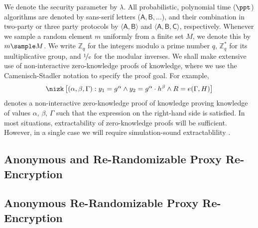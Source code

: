 \documentclass[runningheads]{llncs}
\newcommand{\Z}{\mathbb{Z}}
\DeclareMathOperator{\gen}{\mathsf{Gen}}
\DeclareMathOperator{\prove}{\mathsf{Prove}}
\begin{document}
We denote the security parameter by $\lambda$.
All probabilistic, polynomial time ($\ppt$) algorithms are denoted by sans-serif letters ($\mathsf A, \mathsf B, \ldots$), and  their combination in two-party or three party protocols by $ \langle \mathsf A, \mathsf B\rangle$ and $\langle \mathsf A, \mathsf B, \mathsf C\rangle$, respectively.
Whenever we sample a random element $m$ uniformly from a finite set $M$, we denote this by $m\sample M$.
We write $\Z_q$ for the integers modulo a prime number $q$, $\Z_q^*$ for its multiplicative group, and $\nicefrac{1}{e}$ for the modular inverses.
We shall make extensive use of non-interactive zero-knowledge proofs of knowledge, where we use the Camenisch-Stadler notation to specify the proof goal.
For example, 
\[
\nizk\left[(\alpha, \beta, \Gamma) : y_1 = g^{\alpha}  \wedge y_2 = g^{\alpha}\cdot h^{\beta} \wedge R= e(\Gamma, H) \right] 
\]
denotes a non-interactive zero-knowledge proof of knowledge proving knowledge of values $\alpha$, $\beta$, $\Gamma$ such that the expression on the right-hand side is satisfied. 
In most situations, extractability of zero-knowledge proofs will be sufficient. 
However, in a single case we will require simulation-sound extractablility \cite{ZKP:Groth}.





\ifCANS
\subsection{Anonymous and Re-Randomizable Proxy Re-Encryption}
\else
\subsection{Anonymous Re-Randomizable Proxy Re-Encryption}
\fi
\label{s:PRE}
\end{document}
